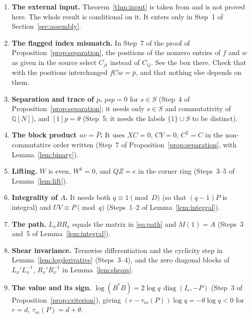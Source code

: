 \documentclass[11pt]{article}
\theoremstyle{remark}
\numberwithin{equation}{section}
\newcommand{\Q}{\mathbb Q}
\newcommand{\diag}{\operatorname{diag}}
\begin{document}
\begin{enumerate}[leftmargin=2em,itemsep=3pt]
\item \textbf{The external input.} Theorem~\ref{thm:input} is taken from \cite{CharacteristicTwo} and is not proved here. The whole result is conditional on it. It enters only in Step~1 of Section~\ref{sec:assembly}.
\item \textbf{The flagged index mismatch.} In Step~7 of the proof of Proposition~\ref{prop:separation}, the positions of the nonzero entries of $f$ and $w$ as given in the source select $C_{ji}$ instead of $C_{ij}$. See the box there. Check that with the positions interchanged $fCw=\bar p$, and that nothing else depends on them.
\item \textbf{Separation and trace of $p$.} $psp=0$ for $s\in S$ (Step~4 of Proposition~\ref{prop:separation}; it needs only $s\in S$ and commutativity of $\Q[N]$), and $[1]p=\theta$ (Step~5; it needs the labels $\{1\}\cup S$ to be distinct).
\item \textbf{The block product $uv=\bar P$.} It uses $XC=0$, $CY=0$, $C^2=C$ in the non-commutative order written (Step~7 of Proposition~\ref{prop:separation}, with Lemma~\ref{lem:binary}).
\item \textbf{Lifting.} $W$ is even, $W^k=0$, and $QZ=e$ in the corner ring (Steps~3--5 of Lemma~\ref{lem:lift}).
\item \textbf{Integrality of $A$.} It needs both $q\equiv1\pmod D$ (so that $(q-1)P$ is integral) and $UV\equiv P\pmod q$ (Steps~1--2 of Lemma~\ref{lem:integral}).
\item \textbf{The path.} $L_xBR_x$ equals the matrix in \eqref{eq:path} and $M(1)=A$ (Steps~3 and~5 of Lemma~\ref{lem:integral}).
\item \textbf{Shear invariance.} Termwise differentiation and the cyclicity step in Lemma~\ref{lem:logderivative} (Steps~3--4), and the zero diagonal blocks of $L_x'L_x^{-1}$, $R_x'R_x^{-1}$ in Lemma~\ref{lem:shears}.
\item \textbf{The value and its sign.} $\log(B^*B)=2\log q\,\diag(I_r,-P)$ (Step~3 of Proposition~\ref{prop:criterion}), giving $(r-\tau_m(P))\log q=-\theta\log q<0$ for $r=d$, $\tau_m(P)=d+\theta$.
\end{enumerate}

\begingroup
\raggedright


\endgroup
\end{document}

